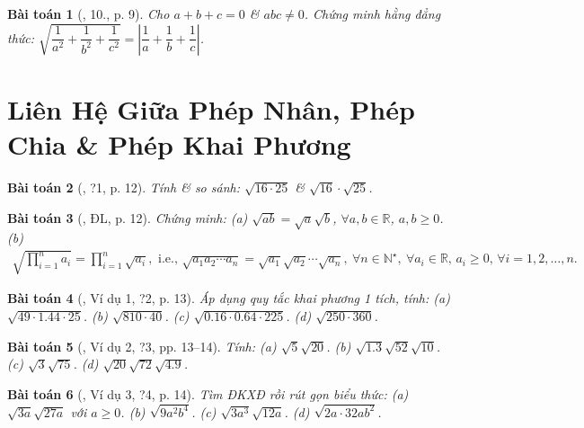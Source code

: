 \documentclass{article}
\newtheorem{baitoan}{Bài toán}
\begin{document}
\begin{baitoan}[\cite{Binh_Toan_9_tap_1}, 10., p. 9]
	Cho $a + b + c = 0$ \& $abc\ne0$. Chứng minh hằng đẳng thức: $\sqrt{\dfrac{1}{a^2} + \dfrac{1}{b^2} + \dfrac{1}{c^2}} = \left|\dfrac{1}{a} + \dfrac{1}{b} + \dfrac{1}{c}\right|$.
\end{baitoan}


\section{Liên Hệ Giữa Phép Nhân, Phép Chia \& Phép Khai Phương}

\begin{baitoan}[\cite{SGK_Toan_9_tap_1}, ?1, p. 12]
	Tính \& so sánh: $\sqrt{16\cdot25}$ \& $\sqrt{16}\cdot\sqrt{25}$.	
\end{baitoan}

\begin{baitoan}[\cite{SGK_Toan_9_tap_1}, ĐL, p. 12]
	Chứng minh: (a) $\sqrt{ab} = \sqrt{a}\sqrt{b}$, $\forall a,b\in\mathbb{R}$, $a,b\ge0$. (b)
	\begin{align*}
		\sqrt{\prod_{i=1}^n a_i} = \prod_{i=1}^n \sqrt{a_i},\mbox{ i.e., }\sqrt{a_1a_2\cdots a_n} = \sqrt{a_1}\sqrt{a_2}\cdots\sqrt{a_n},\ \forall n\in\mathbb{N}^\star,\ \forall a_i\in\mathbb{R},\,a_i\ge0,\,\forall i = 1,2,\ldots,n.
	\end{align*}
\end{baitoan}

\begin{baitoan}[\cite{SGK_Toan_9_tap_1}, Ví dụ 1, ?2, p. 13]
	Áp dụng quy tắc khai phương 1 tích, tính: (a) $\sqrt{49\cdot1.44\cdot25}$. (b) $\sqrt{810\cdot40}$. (c) $\sqrt{0.16\cdot0.64\cdot225}$. (d) $\sqrt{250\cdot360}$.
\end{baitoan}

\begin{baitoan}[\cite{SGK_Toan_9_tap_1}, Ví dụ 2, ?3, pp. 13--14]
	Tính: (a) $\sqrt{5}\sqrt{20}$. (b) $\sqrt{1.3}\sqrt{52}\sqrt{10}$. (c) $\sqrt{3}\sqrt{75}$. (d) $\sqrt{20}\sqrt{72}\sqrt{4.9}$.
\end{baitoan}

\begin{baitoan}[\cite{SGK_Toan_9_tap_1}, Ví dụ 3, ?4, p. 14]
	Tìm ĐKXĐ rồi rút gọn biểu thức: (a) $\sqrt{3a}\sqrt{27a}$ với $a\ge0$. (b) $\sqrt{9a^2b^4}$. (c) $\sqrt{3a^3}\sqrt{12a}$. (d) $\sqrt{2a\cdot32ab^2}$.
\end{baitoan}
\end{document}
